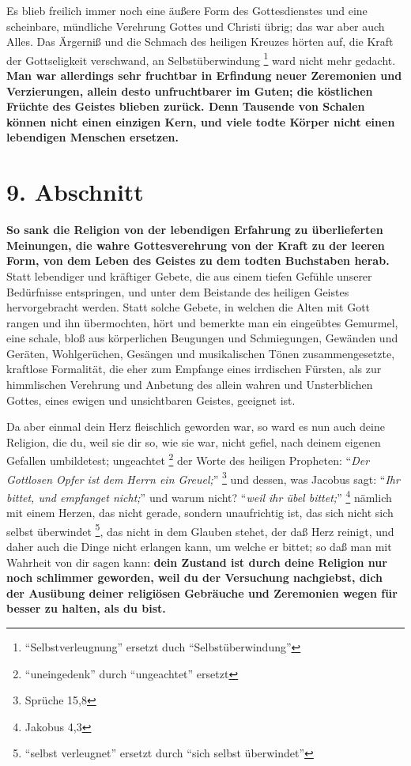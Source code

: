 \medskip 

Es blieb freilich immer noch eine äußere Form des Gottesdienstes und eine
scheinbare, mündliche Verehrung Gottes und Christi übrig; das war aber auch
Alles. Das Ärgerniß und die Schmach des heiligen Kreuzes hörten auf, die Kraft
der Gottseligkeit verschwand, an Selbstüberwindung
\footnote{"`Selbstverleugnung"' ersetzt duch "`Selbstüberwindung"'}
ward nicht mehr gedacht. \textbf{Man
war allerdings sehr fruchtbar in Erfindung neuer Zeremonien und Verzierungen,
allein desto unfruchtbarer im Guten; die köstlichen Früchte des Geistes blieben
zurück. Denn Tausende von Schalen können nicht einen einzigen Kern, und viele
todte Körper nicht einen lebendigen Menschen ersetzen.}

\section{9. Abschnitt}

\textbf{So sank die Religion von der lebendigen Erfahrung zu überlieferten
Meinungen,
die wahre Gottesverehrung von der Kraft zu der leeren Form, von dem Leben des
Geistes zu dem todten Buchstaben herab.} Statt lebendiger und kräftiger Gebete,
die aus einem tiefen Gefühle unserer Bedürfnisse entspringen, und unter dem
Beistande des heiligen Geistes hervorgebracht werden. Statt solche Gebete,
in welchen die Alten mit Gott rangen und ihn übermochten,
hört und bemerkte man ein
eingeübtes Gemurmel, eine schale, bloß aus körperlichen Beugungen und
Schmiegungen, Gewänden und Geräten, Wohlgerüchen, Gesängen und musikalischen
Tönen zusammengesetzte, kraftlose Formalität, die eher zum Empfange eines
irrdischen Fürsten, als zur himmlischen Verehrung und Anbetung des allein wahren
und Unsterblichen Gottes, eines ewigen und unsichtbaren Geistes, geeignet ist.

\medskip 

Da aber einmal dein Herz fleischlich geworden war, so ward es nun auch deine
Religion, die du, weil sie dir so, wie sie war, nicht gefiel, nach deinem
eigenen Gefallen umbildetest; ungeachtet \footnote{"`uneingedenk"' durch
"`ungeachtet"' ersetzt} der Worte des heiligen Propheten:
"`\textit{Der Gottlosen Opfer ist dem Herrn ein Greuel;}"'
\footnote{Sprüche 15,8}  und
dessen, was Jacobus sagt: "`\textit{Ihr bittet, und empfanget nicht;}"' und warum
nicht? "`\textit{weil ihr übel bittet;}"' \footnote{Jakobus 4,3}
 nämlich mit einem
Herzen, das nicht gerade, sondern unaufrichtig ist, das sich nicht sich
selbst überwindet \footnote{"`selbst verleugnet"' ersetzt durch "`sich
selbst überwindet"'}, das nicht in dem Glauben stehet, der daß Herz reinigt,
und daher
auch die Dinge nicht erlangen kann, um welche er bittet; so daß man mit
Wahrheit von dir sagen kann: \textbf{dein Zustand ist durch deine Religion nur noch
schlimmer geworden, weil du der Versuchung nachgiebst, dich der Ausübung
deiner religiösen Gebräuche und Zeremonien wegen für besser zu halten, als du
bist.}

